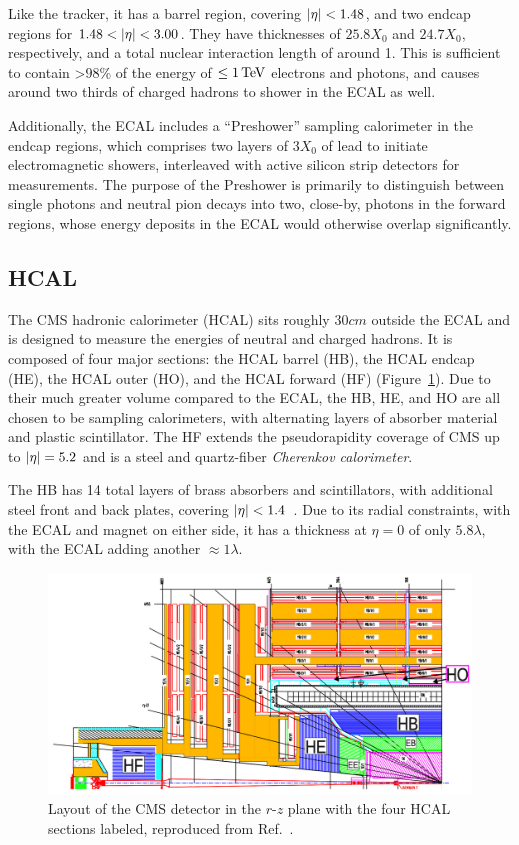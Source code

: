 Like the tracker, it has a barrel region, covering $\left\lvert \eta \right\rvert < 1.48$, and two endcap regions for $1.48 < \left\lvert \eta \right\rvert < 3.00$.
They have thicknesses of $25.8X_0$ and $24.7X_0$, respectively, and a total nuclear interaction length of around 1.
This is sufficient to contain >$98\%$ of the energy of $\leq 1\,\text{Te\hspace{-.08em}V}$ electrons and photons, and causes around two thirds of charged hadrons to shower in the ECAL as well.

Additionally, the ECAL includes a ``Preshower'' sampling calorimeter in the endcap regions, which comprises two layers of $3X_0$ of lead to initiate electromagnetic showers, interleaved with active silicon strip detectors for measurements.
The purpose of the Preshower is primarily to distinguish between single photons and neutral pion decays into two, close-by, photons in the forward regions, whose energy deposits in the ECAL would otherwise overlap significantly.

\subsection{HCAL}

The CMS hadronic calorimeter (HCAL) sits roughly $30\unit{cm}$ outside the ECAL and is designed to measure the energies of neutral and charged hadrons.
It is composed of four major sections: the HCAL barrel (HB), the HCAL endcap (HE), the HCAL outer (HO), and the HCAL forward (HF) (Figure~\ref{fig:02_cms_hcal}).
Due to their much greater volume compared to the ECAL, the HB, HE, and HO are all chosen to be sampling calorimeters, with alternating layers of absorber material and plastic scintillator.
The HF extends the pseudorapidity coverage of CMS up to $\left\lvert \eta \right\rvert = 5.2$ and is a steel and quartz-fiber \textit{Cherenkov calorimeter}.

The HB has 14 total layers of brass absorbers and scintillators, with additional steel front and back plates, covering $\left\lvert \eta \right\rvert < 1.4$~\cite{CMS:2008xjf}.
Due to its radial constraints, with the ECAL and magnet on either side, it has a thickness at $\eta = 0$ of only $5.8\lambda$, with the ECAL adding another $\approx1\lambda$.

\begin{figure}[ht]
    \centering
    \includegraphics[width=\textwidth]{figures/02-CMS/cms/components/hcal_layout.png}
    \caption{Layout of the CMS detector in the $r$-$z$ plane with the four HCAL sections labeled, reproduced from Ref.~\cite{CMS:2012tda}.}
    \label{fig:02_cms_hcal}
\end{figure}

